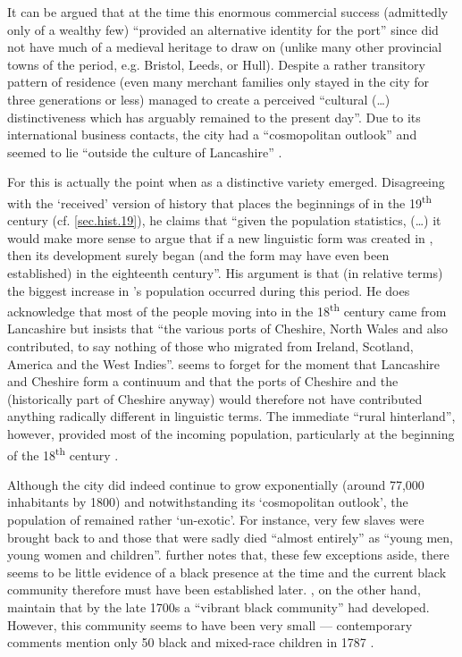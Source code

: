 It can be argued that at the time this enormous commercial success (admittedly only of a wealthy few) ``provided an alternative identity for the port'' since  did not have much of a medieval heritage to draw on (unlike many other provincial towns of the period, e.g. Bristol, Leeds, or Hull).
Despite a rather transitory pattern of residence (even many merchant families only stayed in the city for three generations or less)  managed to create a perceived ``cultural (\ldots) distinctiveness which has arguably remained to the present day''. Due to its international business contacts, the city had a ``cosmopolitan outlook'' and seemed to lie ``outside the culture of Lancashire'' \citep[152--154]{longmore2006}.

For \citet[28]{crowley2012} this is actually the point when  as a distinctive variety emerged.
Disagreeing with the `received' version of  history that places the beginnings of  in the 19\textsuperscript{th} century (cf. \ref{sec.hist.19}), he claims that ``given the population statistics, (\dots) it would make more sense to argue that if a new linguistic form was created in , then its development surely began (and the form may have even been established) in the eighteenth century''.
His argument is that (in relative terms) the biggest increase in 's population occurred during this period.
He does acknowledge that most of the people moving into  in the 18\textsuperscript{th} century came from Lancashire but insists that ``the various ports of Cheshire, North Wales and  also contributed, to say nothing of those who migrated from Ireland, Scotland, America and the West Indies''.
\citeauthor{crowley2012} seems to forget for the moment that Lancashire and Cheshire form a  continuum and that the ports of Cheshire and the  (historically part of Cheshire anyway) would therefore not have contributed anything radically different in linguistic terms.
The immediate ``rural hinterland'', however, provided most of the incoming population, particularly at the beginning of the 18\textsuperscript{th} century \parencite[cf.][119]{longmore2006}.

Although the city did indeed continue to grow exponentially (around 77,000 inhabitants by 1800) and notwithstanding its `cosmopolitan outlook', the population of  remained rather `un-exotic'.
For instance, very few slaves were brought back to  and those that were sadly died ``almost entirely'' as ``young men, young women and children''.
\textcite[cf.][161 and 169]{longmore2006} further notes that, these few exceptions aside, there seems to be little evidence of a black presence at the time and the current black community therefore must have been established later. \textcite{belchemmacraild2006}, on the other hand, maintain that by the late 1700s a ``vibrant black community'' had developed. However, this community seems to have been very small --- contemporary comments mention only 50 black and mixed-race children in 1787 \parencite[324]{belchemmacraild2006}.


